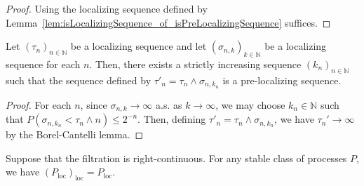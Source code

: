 \begin{proof}\leanok
  Using the localizing sequence defined by Lemma~\ref{lem:isLocalizingSequence_of_isPreLocalizingSequence} suffices.
\end{proof}


\begin{lemma}\label{lem:isPreLocalizingSequence_of_isLocalizingSequence}
  \leanok
Let $(\tau_n)_{n \in \mathbb{N}}$ be a localizing sequence and let $(\sigma_{n,k})_{k \in \mathbb{N}}$ be a localizing sequence for each $n$.
Then, there exists a strictly increasing sequence $(k_n)_{n \in \mathbb{N}}$ such that the sequence defined by $\tau'_n = \tau_n \wedge \sigma_{n,k_n}$ is a pre-localizing sequence.
\end{lemma}

\begin{proof}\leanok
  For each $n$, since $\sigma_{n,k} \to \infty$ a.s. as $k \to \infty$, we may choose $k_n \in \mathbb{N}$ such that $P(\sigma_{n,k_n} < \tau_n \wedge n) \le 2^{-n}$.
  Then, defining $\tau'_n = \tau_n \wedge \sigma_{n,k_n}$, we have $\tau_n' \to \infty$ by the Borel-Cantelli lemma.
\end{proof}


\begin{lemma}\label{lem:locally_locally}
  \leanok
Suppose that the filtration is right-continuous.
For any stable class of processes $P$, we have $(P_{\mathrm{loc}})_{\mathrm{loc}} = P_{\mathrm{loc}}$.
\end{lemma}

